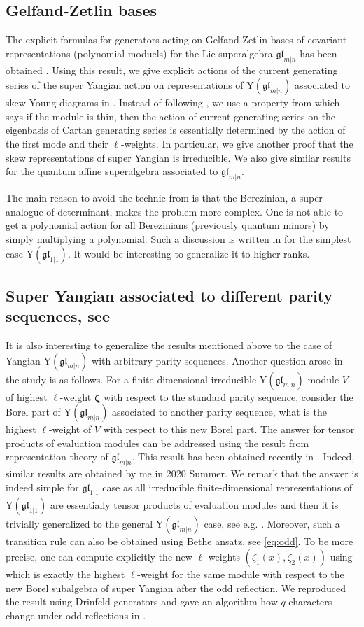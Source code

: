 \documentclass[11pt,reqno]{amsart}
\numberwithin{equation}{section}
\theoremstyle{definition}
\theoremstyle{remark}
\newcommand{\gl}{\mathfrak{gl}}
\newcommand{\tl}{\tilde}
\newcommand{\glMN}{\mathfrak{gl}_{m|n}}
\newcommand{\YglMN}{\mathrm{Y}(\mathfrak{gl}_{m|n})}
\newcommand{\Yone}{\mathrm{Y}(\mathfrak{gl}_{1|1})}
\begin{document}
\subsection{Gelfand-Zetlin bases} The explicit formulas for generators acting on Gelfand-Zetlin bases of covariant representations (polynomial moduels) for the Lie superalgebra $\glMN$ has been obtained \cite{SV:2010}. Using this result, we give explicit actions of the current generating series of the super Yangian action on representations of $\YglMN$ associated to skew Young diagrams in \cite{L:2021a}. Instead of following \cite{NT:1994}, we use a property from \cite{Y:2015} which says if the module is thin, then the action of current generating series on the eigenbasis of Cartan generating series is essentially determined by the action of the first mode and their $\ell$-weights. In particular, we give another proof that the skew representations of super Yangian is irreducible. We also give similar results for the quantum affine superalgebra associated to $\glMN$.

The main reason to avoid the technic from \cite{NT:1994} is that the Berezinian, a super analogue of determinant, makes the problem more complex. One is not able to get a polynomial action for all Berezinians (previously quantum minors) by simply multiplying a polynomial. Such a discussion is written in \cite{M:2021} for the simplest case $\Yone$. It would be interesting to generalize it to higher ranks.

\subsection{Super Yangian associated to different parity sequences, see \cite{CW:2012,P:2016}} It is also interesting to generalize the results mentioned above to the case of Yangian $\YglMN$ with arbitrary parity sequences. Another question arose in the study \cite{HLM:2019} is as follows. For a finite-dimensional irreducible $\YglMN$-module $V$ of highest $\ell$-weight $\bm \zeta$ with respect to the standard parity sequence, consider the Borel part of $\YglMN$ associated to another parity sequence, what is the highest $\ell$-weight of $V$ with respect to this new Borel part. The answer for tensor products of evaluation modules can be addressed using the result from representation theory of $\glMN$. This result has been obtained recently in \cite{M:2021}. Indeed, similar results are obtained by me in 2020 Summer. We remark that the answer is indeed simple for $\gl_{1|1}$ case as all irreducible finite-dimensional representations of $\Yone$ are essentially tensor products of evaluation modules and then it is trivially generalized to the general $\YglMN$ case, see e.g. \cite{M:2021}. Moreover, such a transition rule can also be obtained using Bethe ansatz, see \eqref{eq:odd}. To be more precise, one can compute explicitly the new $\ell$-weights $(\tl{\zeta}_1(x),\tl\zeta_2(x))$ using \cite[Lemma 2.2]{HLM:2019} which is exactly the highest $\ell$-weight for the same module with respect to the new Borel subalgebra of super Yangian after the odd reflection. We reproduced the result using Drinfeld generators and gave an algorithm how $q$-characters change under odd reflections in \cite{L:2021c}.
\end{document}

